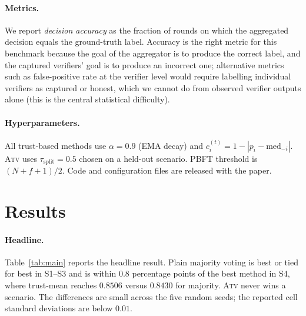 \documentclass[11pt]{article}
\begin{document}
\paragraph{Metrics.}
We report \emph{decision accuracy} as the fraction of rounds on which
the aggregated decision equals the ground-truth label. Accuracy is the
right metric for this benchmark because the goal of the aggregator is
to produce the correct label, and the captured verifiers' goal is to
produce an incorrect one; alternative metrics such as false-positive
rate at the verifier level would require labelling individual
verifiers as captured or honest, which we cannot do from observed
verifier outputs alone (this is the central statistical difficulty).

\paragraph{Hyperparameters.}
All trust-based methods use $\alpha = 0.9$ (EMA decay) and
$c_i^{(t)} = 1 - |p_i - \text{med}_{-i}|$. \textsc{Atv} uses
$\tau_{\text{split}} = 0.5$ chosen on a held-out scenario. PBFT
threshold is $(N+f+1)/2$. Code and configuration files are released
with the paper.

\section{Results}
\label{sec:results}

\paragraph{Headline.}
Table~\ref{tab:main} reports the headline result. Plain majority voting is
best or tied for best in S1--S3 and is within $0.8$ percentage points of the
best method in S4, where trust-mean reaches $0.8506$ versus $0.8430$ for
majority. \textsc{Atv} never wins a scenario. The differences are small
across the five random seeds; the reported cell standard deviations are
below $0.01$.
\end{document}
